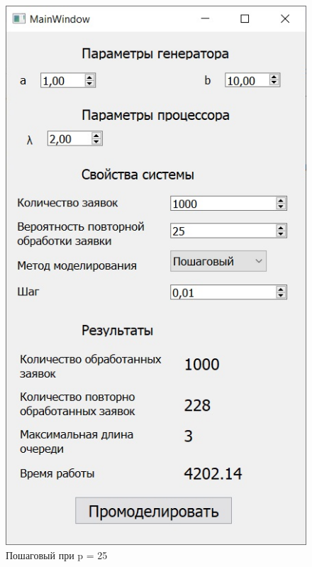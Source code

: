 \documentclass[14pt, a4paper]{extarticle}
\begin{document}
\begin{figure}[h!]
	\centering
	\includegraphics[scale=0.6]{source/step25.jpg}
	\caption{Пошаговый при p = 25}
\end{figure}
\end{document}
